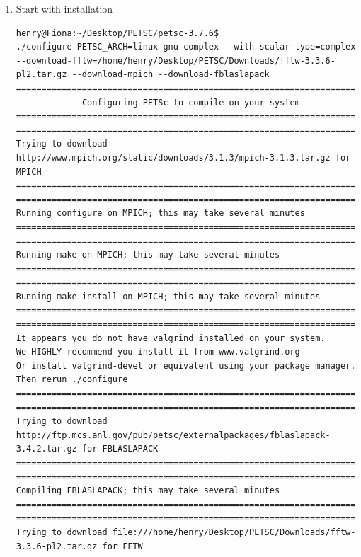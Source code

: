 \documentclass{article}
\begin{document}
\begin{enumerate}
\item Start with installation
\tiny
\begin{verbatim}
henry@Fiona:~/Desktop/PETSC/petsc-3.7.6$ 
./configure PETSC_ARCH=linux-gnu-complex --with-scalar-type=complex --download-fftw=/home/henry/Desktop/PETSC/Downloads/fftw-3.3.6-pl2.tar.gz --download-mpich --download-fblaslapack 
===============================================================================
             Configuring PETSc to compile on your system                       
===============================================================================
===============================================================================                                                                                                                                          
Trying to download http://www.mpich.org/static/downloads/3.1.3/mpich-3.1.3.tar.gz for MPICH
=============================================================================== 
=============================================================================== 
Running configure on MPICH; this may take several minutes
=============================================================================== 
=============================================================================== 
Running make on MPICH; this may take several minutes
===============================================================================
===============================================================================
Running make install on MPICH; this may take several minutes
===============================================================================
===============================================================================
It appears you do not have valgrind installed on your system.
We HIGHLY recommend you install it from www.valgrind.org
Or install valgrind-devel or equivalent using your package manager.
Then rerun ./configure
===============================================================================
===============================================================================
Trying to download http://ftp.mcs.anl.gov/pub/petsc/externalpackages/fblaslapack-3.4.2.tar.gz for FBLASLAPACK
===============================================================================
===============================================================================
Compiling FBLASLAPACK; this may take several minutes
===============================================================================
===============================================================================
Trying to download file:///home/henry/Desktop/PETSC/Downloads/fftw-3.3.6-pl2.tar.gz for FFTW

\end{verbatim}
\end{enumerate}
\end{document}
